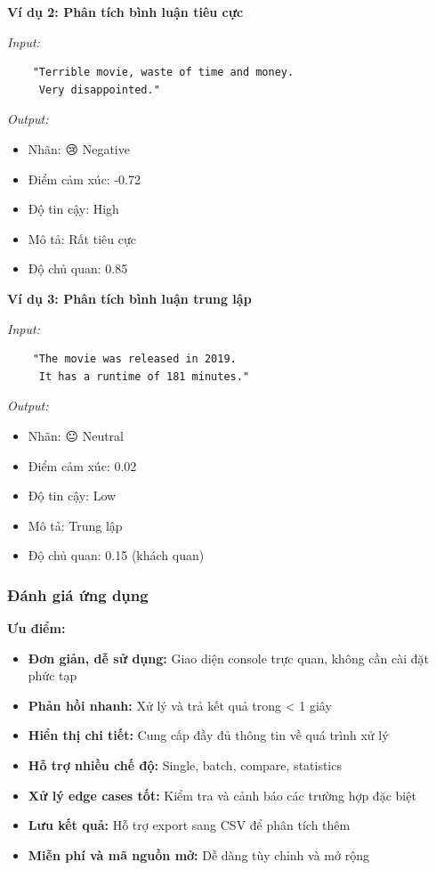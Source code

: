 \textbf{Ví dụ 2: Phân tích bình luận tiêu cực}

\textit{Input:}
\begin{verbatim}
    "Terrible movie, waste of time and money. 
     Very disappointed."
\end{verbatim}

\textit{Output:}
\begin{itemize}
    \item Nhãn: 😢 Negative
    \item Điểm cảm xúc: -0.72
    \item Độ tin cậy: High
    \item Mô tả: Rất tiêu cực
    \item Độ chủ quan: 0.85
\end{itemize}

\textbf{Ví dụ 3: Phân tích bình luận trung lập}

\textit{Input:}
\begin{verbatim}
    "The movie was released in 2019. 
     It has a runtime of 181 minutes."
\end{verbatim}

\textit{Output:}
\begin{itemize}
    \item Nhãn: 😐 Neutral
    \item Điểm cảm xúc: 0.02
    \item Độ tin cậy: Low
    \item Mô tả: Trung lập
    \item Độ chủ quan: 0.15 (khách quan)
\end{itemize}

\subsubsection{Đánh giá ứng dụng}

\textbf{Ưu điểm:}
\begin{itemize}
    \item \textbf{Đơn giản, dễ sử dụng:} Giao diện console trực quan, không cần cài đặt phức tạp
    \item \textbf{Phản hồi nhanh:} Xử lý và trả kết quả trong < 1 giây
    \item \textbf{Hiển thị chi tiết:} Cung cấp đầy đủ thông tin về quá trình xử lý
    \item \textbf{Hỗ trợ nhiều chế độ:} Single, batch, compare, statistics
    \item \textbf{Xử lý edge cases tốt:} Kiểm tra và cảnh báo các trường hợp đặc biệt
    \item \textbf{Lưu kết quả:} Hỗ trợ export sang CSV để phân tích thêm
    \item \textbf{Miễn phí và mã nguồn mở:} Dễ dàng tùy chỉnh và mở rộng
\end{itemize}


